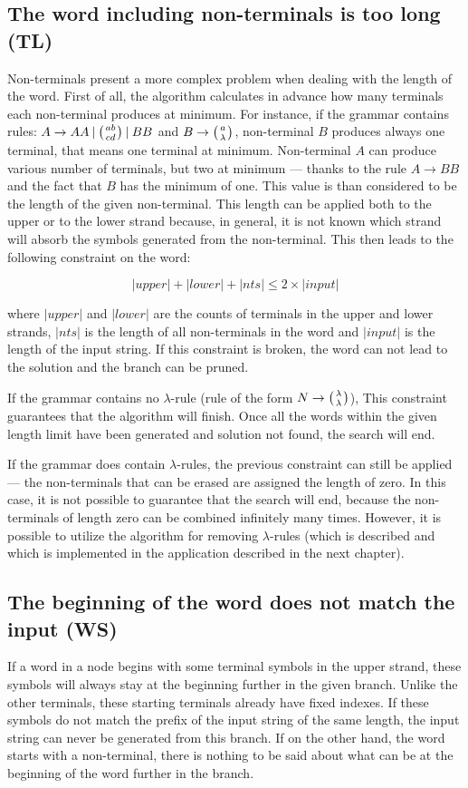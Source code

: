 \subsection{The word including non-terminals is too long (TL)}
Non-terminals present a more complex problem when dealing with the length of the word. First of all, the algorithm calculates in advance how many terminals each non-terminal produces at minimum. For instance, if the grammar contains rules: $A \rightarrow A A \:|\: \wkpair{ab}{cd} \:|\: B B$ and $B \rightarrow \wkpair{a}{\lambda}$, non-terminal $B$ produces always one terminal, that means one terminal at minimum. Non-terminal $A$ can produce various number of terminals, but two at minimum --- thanks to the rule $A \rightarrow B B$ and the fact that $B$ has the minimum of one. This value is than considered to be the length of the given non-terminal.
This length can be applied both to the upper or to the lower strand because, in general, it is not known which strand will absorb the symbols generated from the non-terminal.
This then leads to the following constraint on the word:

$$|upper| + |lower| + |nts| \leq 2 \times |input|$$

where $|upper|$ and $|lower|$ are the counts of terminals in the upper and lower strands, $|nts|$ is the length of all non-terminals in the word and $|input|$ is the length of the input string. If this constraint is broken, the word can not lead to the solution and the branch can be pruned.


If the grammar contains no $\lambda$-rule (rule of the form $N \rightarrow \wkpair{\lambda}{\lambda}$), This constraint guarantees that the algorithm will finish. Once all the words within the given length limit have been generated and solution not found, the search will end.

If the grammar does contain $\lambda$-rules, the previous constraint can still be applied --- the non-terminals that can be erased are assigned the length of zero. In this case, it is not possible to guarantee that the search will end, because the non-terminals of length zero can be combined infinitely many times. However, it is possible to utilize the algorithm for removing $\lambda$-rules (which is described \cite{WK_CYK} and which is implemented in the application described in the next chapter).

\subsection{The beginning of the word does not match the input (WS)}
If a word in a node begins with some terminal symbols in the upper strand, these symbols will always stay at the beginning further in the given branch. Unlike the other terminals, these starting terminals already have fixed indexes. If these symbols do not match the prefix of the input string of the same length, the input string can never be generated from this branch.
If on the other hand, the word starts with a non-terminal, there is nothing to be said about what can be at the beginning of the word further in the branch.

